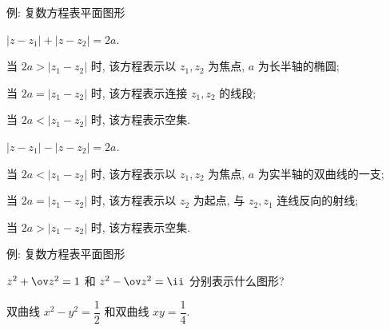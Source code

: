 \begin{frame}{例: 复数方程表平面图形}
	\onslide<+->
	\begin{example}
		\begin{itemize*}
			\item $|z-z_1|+|z-z_2|=2a$.
			\item 当 $2a>|z_1-z_2|$ 时, 该方程表示以 $z_1,z_2$ 为焦点, $a$ 为长半轴的椭圆;
			\item 当 $2a=|z_1-z_2|$ 时, 该方程表示连接 $z_1,z_2$ 的线段;
			\item 当 $2a<|z_1-z_2|$ 时, 该方程表示空集.
		\end{itemize*}
	\end{example}
	\onslide<+->
	\begin{example}
		\begin{itemize*}
			\item $|z-z_1|-|z-z_2|=2a$.
			\item 当 $2a<|z_1-z_2|$ 时, 该方程表示以 $z_1,z_2$ 为焦点, $a$ 为实半轴的双曲线的一支;
			\item 当 $2a=|z_1-z_2|$ 时, 该方程表示以 $z_2$ 为起点, 与 $z_2,z_1$ 连线反向的射线;
			\item 当 $2a>|z_1-z_2|$ 时, 该方程表示空集.	
		\end{itemize*}
	\end{example}
\end{frame}


\begin{frame}{例: 复数方程表平面图形}
	\onslide<+->
	\begin{exercise}[nearnext]
		$z^2+\ov z^2=1$ 和 $z^2-\ov z^2=\ii$ 分别表示什么图形?
	\end{exercise}

	\onslide<+->
	\begin{answer}[nearprev]
		双曲线 $x^2-y^2=\dfrac12$ 和双曲线 $xy=\dfrac14$.
	\end{answer}
\end{frame}


